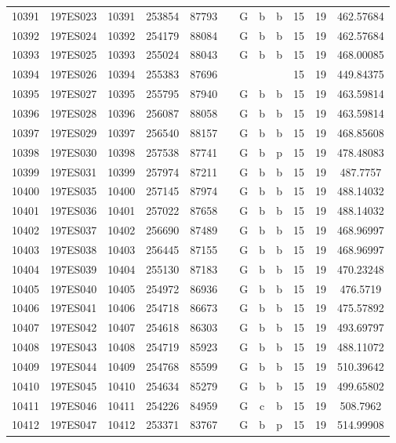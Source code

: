\begin{tabular}{|*{12}{c|}}
10391 & 197ES023 & 10391 & 253854 & 87793 &  & G & b & b & 15 & 19 & 462.57684 \\ 
10392 & 197ES024 & 10392 & 254179 & 88084 &  & G & b & b & 15 & 19 & 462.57684 \\ 
10393 & 197ES025 & 10393 & 255024 & 88043 &  & G & b & b & 15 & 19 & 468.00085 \\ 
10394 & 197ES026 & 10394 & 255383 & 87696 &  &  &  &  & 15 & 19 & 449.84375 \\ 
10395 & 197ES027 & 10395 & 255795 & 87940 &  & G & b & b & 15 & 19 & 463.59814 \\ 
10396 & 197ES028 & 10396 & 256087 & 88058 &  & G & b & b & 15 & 19 & 463.59814 \\ 
10397 & 197ES029 & 10397 & 256540 & 88157 &  & G & b & b & 15 & 19 & 468.85608 \\ 
10398 & 197ES030 & 10398 & 257538 & 87741 &  & G & b & p & 15 & 19 & 478.48083 \\ 
10399 & 197ES031 & 10399 & 257974 & 87211 &  & G & b & b & 15 & 19 & 487.7757 \\ 
10400 & 197ES035 & 10400 & 257145 & 87974 &  & G & b & b & 15 & 19 & 488.14032 \\ 
10401 & 197ES036 & 10401 & 257022 & 87658 &  & G & b & b & 15 & 19 & 488.14032 \\ 
10402 & 197ES037 & 10402 & 256690 & 87489 &  & G & b & b & 15 & 19 & 468.96997 \\ 
10403 & 197ES038 & 10403 & 256445 & 87155 &  & G & b & b & 15 & 19 & 468.96997 \\ 
10404 & 197ES039 & 10404 & 255130 & 87183 &  & G & b & b & 15 & 19 & 470.23248 \\ 
10405 & 197ES040 & 10405 & 254972 & 86936 &  & G & b & b & 15 & 19 & 476.5719 \\ 
10406 & 197ES041 & 10406 & 254718 & 86673 &  & G & b & b & 15 & 19 & 475.57892 \\ 
10407 & 197ES042 & 10407 & 254618 & 86303 &  & G & b & b & 15 & 19 & 493.69797 \\ 
10408 & 197ES043 & 10408 & 254719 & 85923 &  & G & b & b & 15 & 19 & 488.11072 \\ 
10409 & 197ES044 & 10409 & 254768 & 85599 &  & G & b & b & 15 & 19 & 510.39642 \\ 
10410 & 197ES045 & 10410 & 254634 & 85279 &  & G & b & b & 15 & 19 & 499.65802 \\ 
10411 & 197ES046 & 10411 & 254226 & 84959 &  & G & c & b & 15 & 19 & 508.7962 \\ 
10412 & 197ES047 & 10412 & 253371 & 83767 &  & G & b & p & 15 & 19 & 514.99908 \\ 

\end{tabular}
